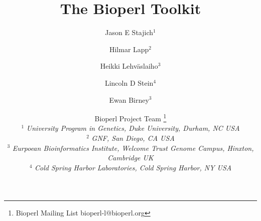 \documentclass[12pt]{article}
\begin{document}
\title{The Bioperl Toolkit}
\author{Jason E Stajich$^1$ \and
Hilmar Lapp$^2$ \and
Heikki Lehv\"{a}slaiho$^3$ \and 
Lincoln D Stein$^4$ \and Ewan Birney$^3$ \and
Bioperl Project Team \thanks{Bioperl Mailing List bioperl-l@bioperl.org} \\
$^1$ \small{\textit{University Program in Genetics, Duke University,  Durham, NC USA}} \\
$^2$ \small{\textit{GNF, San Diego, CA USA}} \\
$^3$ \small{\textit{Eurpoean Bioinformatics Institute, Welcome Trust
Genome Campus, Hinxton, Cambridge UK}} \\
$^4$ \small{\textit{Cold Spring Harbor Laboratories, Cold Spring Harbor, NY USA }}\\
}
\maketitle
\end{document}

